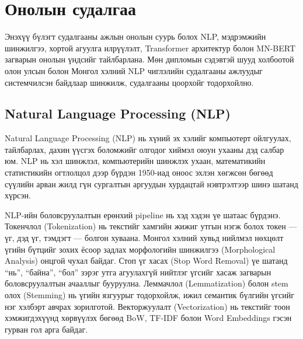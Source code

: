 
\chapter{Онолын судалгаа}
\label{Chapter1}

Энэхүү бүлэгт судалгааны ажлын онолын суурь болох NLP, мэдрэмжийн шинжилгээ,
хортой агуулга илрүүлэлт, Transformer архитектур болон MN-BERT загварын онолын
үндсийг тайлбарлана. Мөн дипломын сэдэвтэй шууд холбоотой олон улсын болон
Монгол хэлний NLP чиглэлийн судалгааны ажлуудыг системчилсэн байдлаар шинжилж,
судалгааны цоорхойг тодорхойлно.


\section{Natural Language Processing (NLP)}

Natural Language Processing (NLP) нь хүний эх хэлийг компьютерт ойлгуулах,
тайлбарлах, дахин үүсгэх боломжийг олгодог хиймэл оюун ухааны дэд салбар юм.
NLP нь хэл шинжлэл, компьютерийн шинжлэх ухаан, математикийн статистикийн
огтлолцол дээр бүрдэн 1950-иад оноос эхлэн хөгжсөн бөгөөд сүүлийн арван жилд
гүн сургалтын аргуудын хурдацтай нэвтрэлтээр шинэ шатанд хүрсэн.

NLP-ийн боловсруулалтын ерөнхий pipeline нь хэд хэдэн үе шатаас бүрдэнэ.
Токенчлол (Tokenization) нь текстийг хамгийн жижиг утгын нэгж болох токен ---
үг, дэд үг, тэмдэгт --- болгон хуваана. Монгол хэлний хувьд нийлмэл нөхцөлт
үгийн бүтцийг зохих ёсоор задлах морфологийн шинжилгээ (Morphological
Analysis) онцгой чухал байдаг. Стоп үг хасах (Stop Word Removal) үе шатанд
``нь'', ``байна'', ``бол'' зэрэг утга агуулахгүй нийтлэг үгсийг хасаж загварын
боловсруулалтын ачааллыг бууруулна. Леммачлол (Lemmatization) болон stem олох
(Stemming) нь үгийн язгуурыг тодорхойлж, ижил семантик бүлгийн үгсийг нэг
хэлбэрт авчрах зорилготой. Векторжуулалт (Vectorization) нь текстийг тоон
хэмжигдэхүүнд хөрвүүлэх бөгөөд BoW, TF-IDF болон Word Embeddings гэсэн гурван
гол арга байдаг.

